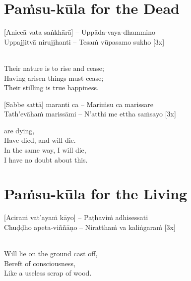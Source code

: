 \suttaRef{[Khp 7]}

\section{Paṁsu-kūla for the Dead}
\label{pamsu-kula-dead}

\vspace{-0.8em}

[Aniccā vata saṅkhārā] – Uppāda-vaya-dhammino\\
Uppajjitvā nirujjhanti – Tesaṁ vūpasamo sukho \hfill{[3x]}

\begin{english-verses}
  \\
  Their nature is to rise and cease;\hyperlink{endnote129-appendix}{\hypertarget{endnote129-body}{}}\\
  Having arisen things must cease;\\
  Their stilling is true happiness.
\end{english-verses}

\suttaRef{[DN 16]}

[Sabbe sattā] maranti ca – Mariṁsu ca marissare\\
Tath'evāhaṁ marissāmi – N'atthi me ettha saṁsayo \hfill{[3x]}

\begin{english-verses}
   are dying,\\
  Have died, and will die.\\
  In the same way, I will die,\\
  I have no doubt about this.
\end{english-verses}

\suttaRef{[Thai]}

\section{Paṁsu-kūla for the Living}
\label{pamsu-kula-living}

\vspace{-0.6em}

[Aciraṁ vat'ayaṁ kāyo] – Paṭhaviṁ adhisessati\\
Chuḍḍho apeta-viññāṇo – Niratthaṁ va kaliṅgaraṁ \hfill{[3x]}

\begin{english-verses}
  \\
  Will lie on the ground cast off,\\
  Bereft of consciousness,\\
  Like a useless scrap of wood.
\end{english-verses}

